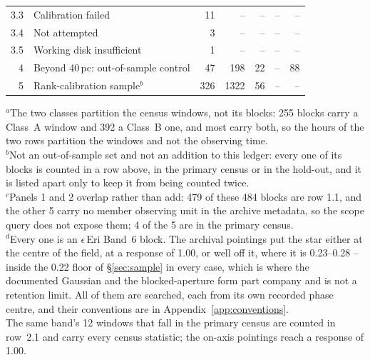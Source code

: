 \begin{tabular}{@{}r@{~}p{}rrrrr@{}}
3.3 & \hspace{0.8em}Calibration failed & 11 & -- & -- & -- & -- \\
3.4 & \hspace{0.8em}Not attempted & 3 & -- & -- & -- & -- \\
3.5 & \hspace{0.8em}Working disk insufficient & 1 & -- & -- & -- & -- \\
\hline
4 & Beyond 40\,pc: out-of-sample control & 47 & 198 & 22 & -- & 88 \\
5 & Rank-calibration sample$^{b}$ & 326 & 1322 & 56 & -- & -- \\
\hline
\end{tabular}

{\footnotesize\raggedright $^{a}$The two classes partition the census windows, not its blocks: 255 blocks carry a Class~A window and 392 a Class~B one, and most carry both, so the hours of the two rows partition the windows and not the observing time.\\ $^{b}$Not an out-of-sample set and not an addition to this ledger: every one of its blocks is counted in a row above, in the primary census or in the hold-out, and it is listed apart only to keep it from being counted twice.\\ $^{c}$Panels 1 and 2 overlap rather than add: 479 of these 484 blocks are row 1.1, and the other 5 carry no member observing unit in the archive metadata, so the scope query does not expose them; 4 of the 5 are in the primary census.\\ $^{d}$Every one is an $\epsilon$\,Eri Band~6 block. The archival pointings put the star either at the centre of the field, at a response of 1.00, or well off it, where it is 0.23--0.28 -- inside the 0.22 floor of \S\ref{sec:sample} in every case, which is where the documented Gaussian and the blocked-aperture form part company and is not a retention limit. All of them are searched, each from its own recorded phase centre, and their conventions are in Appendix~\ref{app:conventions}.\\ The same band's 12 windows that fall in the primary census are counted in row~2.1 and carry every census statistic; the on-axis pointings reach a response of 1.00.}
